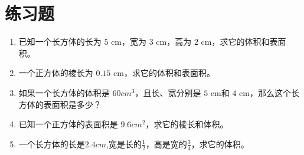 \documentclass[DIN, pagenumber=false, fontsize=11pt, parskip=half]{scrartcl}
\begin{document}
\bigskip
\section{练习题}
\begin{enumerate}
    \item 已知一个长方体的长为 $5$ cm，宽为 $3$ cm，高为 $2$ cm，求它的体积和表面积。
    \item 一个正方体的棱长为 $0.15$ cm，求它的体积和表面积。
    \item 如果一个长方体的体积是 $60 cm^3$，且长、宽分别是 $5$ cm和 $4$ cm，那么这个长方体的表面积是多少？
    \item 已知一个正方体的表面积是 $9.6 cm^2$，求它的棱长和体积。
    \item 一个长方体的长是$2.4cm$,宽是长的$\frac{1}{2}$，高是宽的$\frac{3}{4}$，求它的体积。
\end{enumerate}     
\end{document}

